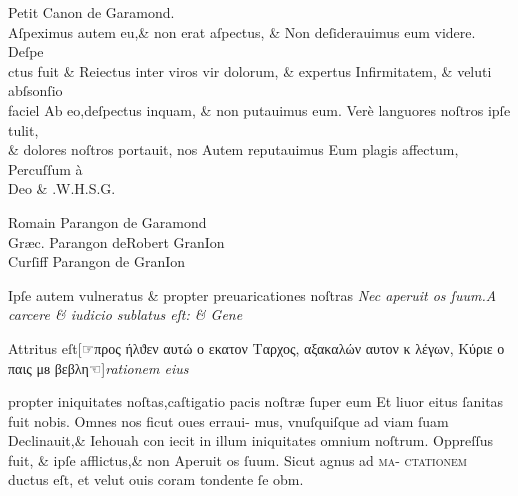 \documentclass[letterpaper]{article}
\newcommand{\threecolumntypefacenames}[3]{\begin{multicols}{3}
		\tiny
		\hfill \qquad \qquad \qquad \qquad #1\hspace*{\fill}\\
		\columnbreak
		\hfill #2\hspace*{\fill}\\
		\columnbreak
		\hfill #3\qquad \qquad \qquad \qquad \hspace*{\fill}
\end{multicols}}
\begin{document}
{\small
\centering
Petit Canon de Garamond.\\
\vspace{-0.5\baselineskip}
\Large
\justifying
Aſpeximus autem eu,\& non erat aſpectus, \& Non deſiderauimus eum videre. Deſpe \\
ctus fuit \& Reiectus inter viros vir dolorum, \& expertus Infirmitatem, \& veluti abſsonſio \\
faciel Ab eo,deſpectus inquam, \& non putauimus eum. Ver\`e languores noſtros ipſe tulit, \\
\& dolores noſtros portauit, nos Autem reputauimus Eum plagis affectum, Percuſſum \`a\\
\centering
Deo \& .\quad  W.\quad H.\quad S.\quad G.\quad \\
\vspace{-\baselineskip}
\threecolumntypefacenames{Romain Parangon de Garamond}{Gr\ae{}c. Parangon deRobert GranIon\quad \quad \quad \quad \quad \quad \quad \quad }{Curſiff Parangon de GranIon}
\vspace*{-\baselineskip}
\scriptsize
\begin{multicols}{2}
	\justifying
	\normalsize
	\justifying
	Ipſe autem vulneratus \& propter preuaricationes noſtras\linebreak
	\columnbreak
	\textit{Nec aperuit os ſuum.A carcere \& iudicio sublatus eſt: \& Gene}
\end{multicols}
\vspace{-1.55\baselineskip}
\normalsize
\justifying
\noindent
Attritus eſt\hfill[\hfill☞\hfill προς  ήλϑεν  αυτώ  ο εκατον Ταρχος,  αξακαλών αυτον κ λέγων, Κύριε ο  παις μᴕ βεβλη\hfill ☜\hfill ]\hfill \textit{rationem eius}
\vspace{-1.05\baselineskip}
\begin{multicols}{2}
	\noindent propter iniquitates noſtas,caſtigatio pacis noſtr\ae{} ſuper eum\linebreak
	Et liuor eitus ſanitas fuit nobis. Omnes nos ficut oues erraui-\linebreak
	mus, vnuſquiſque ad viam ſuam Declinauit,\& Iehouah con\linebreak
	iecit in illum iniquitates omnium noſtrum. Oppreſſus fuit,\linebreak
	\& ipſe afflictus,\& non Aperuit os ſuum. Sicut agnus ad \textsc{ma}-\linebreak
	\textsc{ctationem} ductus eſt, et velut ouis coram tondente ſe obm.\\


\end{multicols}}
\end{document}
